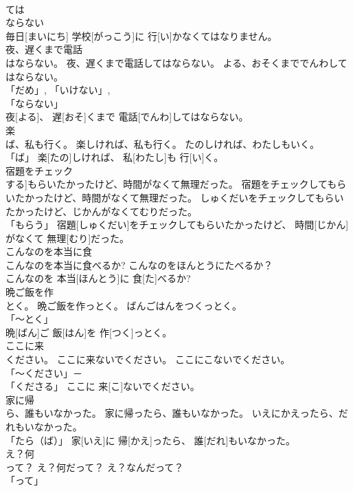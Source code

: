 \documentclass[8pt]{extreport}
\begin{document}
\begin{CJK}{UTF8}{min}
\\	ては
\\	ならない
\\	毎日[まいにち] 学校[がっこう]に 行[い]かなくてはなりません。		
\\	夜、遅くまで電話
\\	はならない。	夜、遅くまで電話してはならない。	よる、おそくまででんわしてはならない。	
\\	「だめ」, 「いけない」, 
\\	「ならない」 
\\	夜[よる]、 遅[おそ]くまで 電話[でんわ]してはならない。		
\\	楽
\\	ば、私も行く。	楽しければ、私も行く。	たのしければ、わたしもいく。	
\\	「ば」	楽[たの]しければ、 私[わたし]も 行[い]く。		
\\	宿題をチェック
\\	する]もらいたかったけど、時間がなくて無理だった。	宿題をチェックしてもらいたかったけど、時間がなくて無理だった。	しゅくだいをチェックしてもらいたかったけど、じかんがなくてむりだった。	
\\	「もらう」	宿題[しゅくだい]をチェックしてもらいたかったけど、 時間[じかん]がなくて 無理[むり]だった。		
\\	こんなのを本当に食
\\	こんなのを本当に食べるか?	こんなのをほんとうにたべるか？	
\\	こんなのを 本当[ほんとう]に 食[た]べるか?		
\\	晩ご飯を作
\\	とく。	晩ご飯を作っとく。	ばんごはんをつくっとく。	
\\	「～とく」 
\\	晩[ばん]ご 飯[はん]を 作[つく]っとく。		
\\	ここに来
\\	ください。	ここに来ないでください。	ここにこないでください。	
\\	「～ください」－ 
\\	「くださる」	ここに 来[こ]ないでください。		
\\	家に帰
\\	ら、誰もいなかった。	家に帰ったら、誰もいなかった。	いえにかえったら、だれもいなかった。	
\\	「たら（ば）」	家[いえ]に 帰[かえ]ったら、 誰[だれ]もいなかった。		
\\	え？何
\\	って？	え？何だって？	え？なんだって？	
\\	「って」 

\end{CJK}
\end{document}

